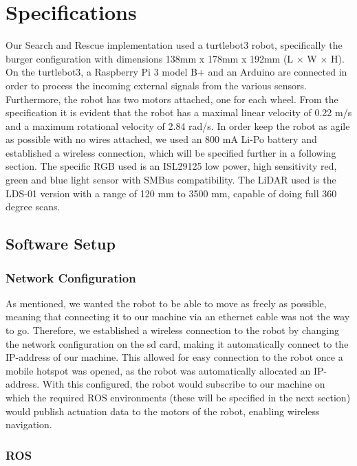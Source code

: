 \documentclass[conference]{IEEEtran}
\begin{document}
\section{Specifications}
Our Search and Rescue implementation used a turtlebot3 robot, specifically the burger configuration with dimensions 138mm x 178mm x 192mm (L $\times$ W $\times$ H)\cite{b1}.
On the turtlebot3, a Raspberry Pi 3 model B+ and an Arduino are connected in order to process the incoming external signals from the various sensors.
Furthermore, the robot has two motors attached, one for each wheel. From the specification it is evident that the robot has a maximal linear velocity of 0.22 m/s
and a maximum rotational velocity of 2.84 rad/s. In order keep the robot as agile as possible with no wires attached, we used an 800 mA Li-Po battery and established a wireless connection, which will be specified further in a following section.
The specific RGB used is an ISL29125 low power, high sensitivity red, green and blue light sensor with SMBus compatibility\cite{b2}.
The LiDAR used is the LDS-01 version with a range of 120 mm to 3500 mm, capable of doing full 360 degree scans. \cite{b3}

\subsection{Software Setup}

\subsubsection{Network Configuration}
As mentioned, we wanted the robot to be able to move as freely as possible, meaning that connecting it to our machine via an ethernet cable was not the way to go.
Therefore, we established a wireless connection to the robot by changing the network configuration on the sd card, making it automatically connect to the IP-address of our machine.
This allowed for easy connection to the robot once a mobile hotspot was opened, as the robot was automatically allocated an IP-address.
With this configured, the robot would subscribe to our machine on which the required ROS environments (these will be specified in the next section) would publish actuation data to the motors of the robot, enabling wireless navigation.

\subsubsection{ROS}
\end{document}
